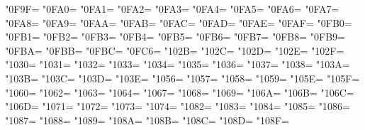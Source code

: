 \XeTeXcharclass"0F9F=\KclassCM
\XeTeXcharclass"0FA0=\KclassCM
\XeTeXcharclass"0FA1=\KclassCM
\XeTeXcharclass"0FA2=\KclassCM
\XeTeXcharclass"0FA3=\KclassCM
\XeTeXcharclass"0FA4=\KclassCM
\XeTeXcharclass"0FA5=\KclassCM
\XeTeXcharclass"0FA6=\KclassCM
\XeTeXcharclass"0FA7=\KclassCM
\XeTeXcharclass"0FA8=\KclassCM
\XeTeXcharclass"0FA9=\KclassCM
\XeTeXcharclass"0FAA=\KclassCM
\XeTeXcharclass"0FAB=\KclassCM
\XeTeXcharclass"0FAC=\KclassCM
\XeTeXcharclass"0FAD=\KclassCM
\XeTeXcharclass"0FAE=\KclassCM
\XeTeXcharclass"0FAF=\KclassCM
\XeTeXcharclass"0FB0=\KclassCM
\XeTeXcharclass"0FB1=\KclassCM
\XeTeXcharclass"0FB2=\KclassCM
\XeTeXcharclass"0FB3=\KclassCM
\XeTeXcharclass"0FB4=\KclassCM
\XeTeXcharclass"0FB5=\KclassCM
\XeTeXcharclass"0FB6=\KclassCM
\XeTeXcharclass"0FB7=\KclassCM
\XeTeXcharclass"0FB8=\KclassCM
\XeTeXcharclass"0FB9=\KclassCM
\XeTeXcharclass"0FBA=\KclassCM
\XeTeXcharclass"0FBB=\KclassCM
\XeTeXcharclass"0FBC=\KclassCM
\XeTeXcharclass"0FC6=\KclassCM
\XeTeXcharclass"102B=\KclassCM
\XeTeXcharclass"102C=\KclassCM
\XeTeXcharclass"102D=\KclassCM
\XeTeXcharclass"102E=\KclassCM
\XeTeXcharclass"102F=\KclassCM
\XeTeXcharclass"1030=\KclassCM
\XeTeXcharclass"1031=\KclassCM
\XeTeXcharclass"1032=\KclassCM
\XeTeXcharclass"1033=\KclassCM
\XeTeXcharclass"1034=\KclassCM
\XeTeXcharclass"1035=\KclassCM
\XeTeXcharclass"1036=\KclassCM
\XeTeXcharclass"1037=\KclassCM
\XeTeXcharclass"1038=\KclassCM
\XeTeXcharclass"103A=\KclassCM
\XeTeXcharclass"103B=\KclassCM
\XeTeXcharclass"103C=\KclassCM
\XeTeXcharclass"103D=\KclassCM
\XeTeXcharclass"103E=\KclassCM
\XeTeXcharclass"1056=\KclassCM
\XeTeXcharclass"1057=\KclassCM
\XeTeXcharclass"1058=\KclassCM
\XeTeXcharclass"1059=\KclassCM
\XeTeXcharclass"105E=\KclassCM
\XeTeXcharclass"105F=\KclassCM
\XeTeXcharclass"1060=\KclassCM
\XeTeXcharclass"1062=\KclassCM
\XeTeXcharclass"1063=\KclassCM
\XeTeXcharclass"1064=\KclassCM
\XeTeXcharclass"1067=\KclassCM
\XeTeXcharclass"1068=\KclassCM
\XeTeXcharclass"1069=\KclassCM
\XeTeXcharclass"106A=\KclassCM
\XeTeXcharclass"106B=\KclassCM
\XeTeXcharclass"106C=\KclassCM
\XeTeXcharclass"106D=\KclassCM
\XeTeXcharclass"1071=\KclassCM
\XeTeXcharclass"1072=\KclassCM
\XeTeXcharclass"1073=\KclassCM
\XeTeXcharclass"1074=\KclassCM
\XeTeXcharclass"1082=\KclassCM
\XeTeXcharclass"1083=\KclassCM
\XeTeXcharclass"1084=\KclassCM
\XeTeXcharclass"1085=\KclassCM
\XeTeXcharclass"1086=\KclassCM
\XeTeXcharclass"1087=\KclassCM
\XeTeXcharclass"1088=\KclassCM
\XeTeXcharclass"1089=\KclassCM
\XeTeXcharclass"108A=\KclassCM
\XeTeXcharclass"108B=\KclassCM
\XeTeXcharclass"108C=\KclassCM
\XeTeXcharclass"108D=\KclassCM
\XeTeXcharclass"108F=\KclassCM
